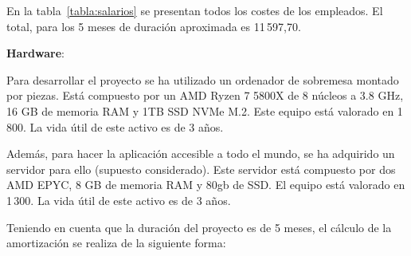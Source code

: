 \begin{table}[H]
\caption{Salarios brutos y coste que supone a la empresa}
\label{tabla:salarios}
\end{table}

En la tabla~\ref{tabla:salarios} se presentan todos los costes de los empleados.
El total, para los 5 meses de duración aproximada es 11\,597,70\texteuro.

\textbf{Hardware}:

Para desarrollar el proyecto se ha utilizado un ordenador de sobremesa montado
por piezas. Está compuesto por un AMD Ryzen 7 5800X de 8 núcleos a 3.8 GHz, 16
GB de memoria RAM y 1TB SSD NVMe M.2. Este equipo está valorado en
1\,800\texteuro. La vida útil de este activo es de 3 años.

Además, para hacer la aplicación accesible a todo el mundo, se ha adquirido un
servidor para ello (supuesto considerado). Este servidor está compuesto por dos
AMD EPYC, 8 GB de memoria RAM y 80gb de SSD. El equipo está valorado en
1\,300\texteuro. La vida útil de este activo es de 3 años.

Teniendo en cuenta que la duración del proyecto es de 5 meses, el cálculo de la
amortización se realiza de la siguiente forma:

